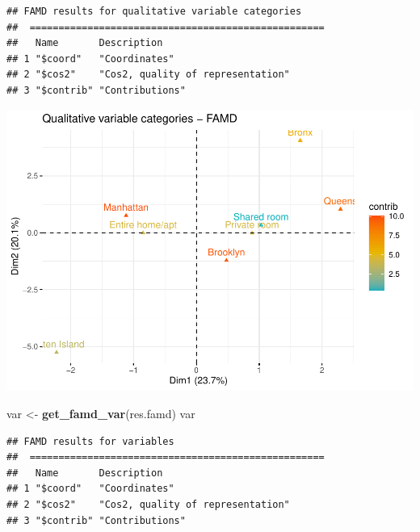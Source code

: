 \documentclass[
]{article}
\newenvironment{Shaded}{\begin{snugshade}}{\end{snugshade}}
\newcommand{\DataTypeTok}[1]{\textcolor[rgb]{0.13,0.29,0.53}{#1}}
\newcommand{\KeywordTok}[1]{\textcolor[rgb]{0.13,0.29,0.53}{\textbf{#1}}}
\newcommand{\NormalTok}[1]{#1}
\newcommand{\StringTok}[1]{\textcolor[rgb]{0.31,0.60,0.02}{#1}}
\begin{document}
\begin{verbatim}
## FAMD results for qualitative variable categories 
##  ===================================================
##   Name       Description                      
## 1 "$coord"   "Coordinates"                    
## 2 "$cos2"    "Cos2, quality of representation"
## 3 "$contrib" "Contributions"
\end{verbatim}

\begin{Shaded}
\end{Shaded}

\includegraphics{project-code_files/figure-latex/unnamed-chunk-35-1.pdf}

\begin{Shaded}
\begin{Highlighting}[]
\NormalTok{var <-}\StringTok{ }\KeywordTok{get_famd_var}\NormalTok{(res.famd)}
\NormalTok{var}
\end{Highlighting}
\end{Shaded}

\begin{verbatim}
## FAMD results for variables 
##  ===================================================
##   Name       Description                      
## 1 "$coord"   "Coordinates"                    
## 2 "$cos2"    "Cos2, quality of representation"
## 3 "$contrib" "Contributions"
\end{verbatim}
\end{document}
